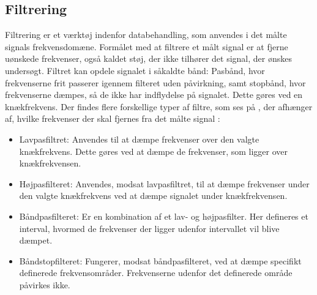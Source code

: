 \subsection{Filtrering}
Filtrering er et værktøj indenfor databehandling, som anvendes i det målte signals frekvensdomæne. Formålet med at filtrere et målt signal er at fjerne uønskede frekvenser, også kaldet støj, der ikke tilhører det signal, der ønskes undersøgt. Filtret kan opdele signalet i såkaldte bånd: Pasbånd, hvor frekvenserne frit passerer igennem filteret uden påvirkning, samt stopbånd, hvor frekvenserne dæmpes, så de ikke har indflydelse på signalet. Dette gøres ved en knækfrekvens.
Der findes flere forskellige typer af filtre, som ses på , der afhænger af, hvilke frekvenser der skal fjernes fra det målte signal \cite{Devasahayam2000}:

\begin{itemize}
	\item Lavpasfiltret: Anvendes til at dæmpe frekvenser over den valgte knækfrekvens. Dette gøres ved at dæmpe de frekvenser, som ligger over knækfrekvensen.
	\item Højpasfilteret: Anvendes, modsat lavpasfiltret, til at dæmpe frekvenser under den valgte knækfrekvens ved at dæmpe signalet under knækfrekvensen.
	\item Båndpasfilteret: Er en kombination af et lav- og højpasfilter.  Her defineres et interval, hvormed de frekvenser der ligger udenfor intervallet vil blive dæmpet.
	\item Båndstopfilteret: Fungerer, modsat båndpasfilteret, ved at dæmpe specifikt definerede frekvensområder. Frekvenserne udenfor det definerede område påvirkes ikke. 
\end{itemize}
  
